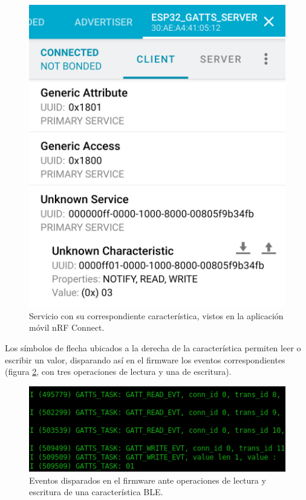 \begin{figure}[h]
\centering
\includegraphics[scale=0.20]{./Figures/nrf_char_esp32.png}
\caption{Servicio con su correspondiente característica, vistos en la aplicación móvil nRF Connect.}
\label{fig:nrf_char_esp32}
\end{figure}

Los símbolos de flecha ubicados a la derecha de la característica permiten leer o escribir un valor, disparando así en el firmware los eventos correspondientes (figura \ref{fig:output_ble_event}, con tres operaciones de lectura y una de escritura).

\begin{figure}[h]
\centering
\includegraphics[width=\textwidth]{./Figures/output_ble_event.png}
\caption{Eventos disparados en el firmware ante operaciones de lectura y escritura de una característica BLE.}
\label{fig:output_ble_event}
\end{figure}


